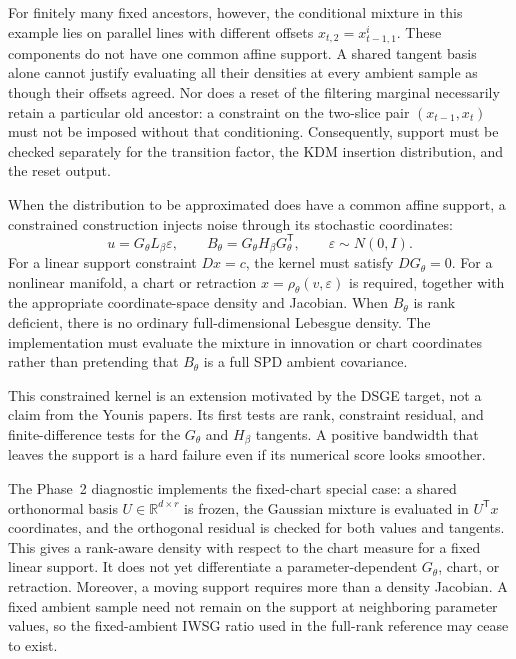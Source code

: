 \documentclass[11pt]{article}
\newcommand{\R}{\mathbb{R}}
\begin{document}
For finitely many fixed ancestors, however, the conditional mixture in this
example lies on parallel lines with different offsets $x_{t,2}=x_{t-1,1}^i$.
These components do not have one common affine support.  A shared tangent
basis alone cannot justify evaluating all their densities at every ambient
sample as though their offsets agreed.  Nor does a reset of the filtering
marginal necessarily retain a particular old ancestor: a constraint on the
two-slice pair $(x_{t-1},x_t)$ must not be imposed without that conditioning.
Consequently, support must be checked separately for the transition factor,
the KDM insertion distribution, and the reset output.

When the distribution to be approximated does have a common affine support,
a constrained construction injects noise through its stochastic coordinates:
\begin{equation}
 u=G_\theta L_\beta\varepsilon,\qquad
 B_\theta=G_\theta H_\beta G_\theta^\mathsf{T},\qquad
 \varepsilon\sim N(0,I).
 \label{eq:innovation-kernel}
\end{equation}
For a linear support constraint $D x=c$, the kernel must satisfy
$D G_\theta=0$.  For a nonlinear manifold, a chart or retraction
$x=\rho_\theta(v,\varepsilon)$ is required, together with the appropriate
coordinate-space density and Jacobian.  When $B_\theta$ is rank deficient,
there is no ordinary full-dimensional Lebesgue density.  The implementation
must evaluate the mixture in innovation or chart coordinates rather than
pretending that $B_\theta$ is a full SPD ambient covariance.

This constrained kernel is an extension motivated by the DSGE target, not a
claim from the Younis papers.  Its first tests are rank, constraint residual,
and finite-difference tests for the $G_\theta$ and $H_\beta$ tangents.  A
positive bandwidth that leaves the support is a hard failure even if its
numerical score looks smoother.

The Phase~2 diagnostic implements the fixed-chart special case: a shared
orthonormal basis $U\in\R^{d\times r}$ is frozen, the Gaussian mixture is
evaluated in $U^\mathsf{T}x$ coordinates, and the orthogonal residual is checked
for both values and tangents.  This gives a rank-aware density with respect to
the chart measure for a fixed linear support.  It does not yet differentiate a
parameter-dependent $G_\theta$, chart, or retraction.  Moreover, a moving
support requires more than a density Jacobian.  A fixed ambient sample need
not remain on the support at neighboring parameter values, so the
fixed-ambient IWSG ratio used in the full-rank reference may cease to exist.
\end{document}
